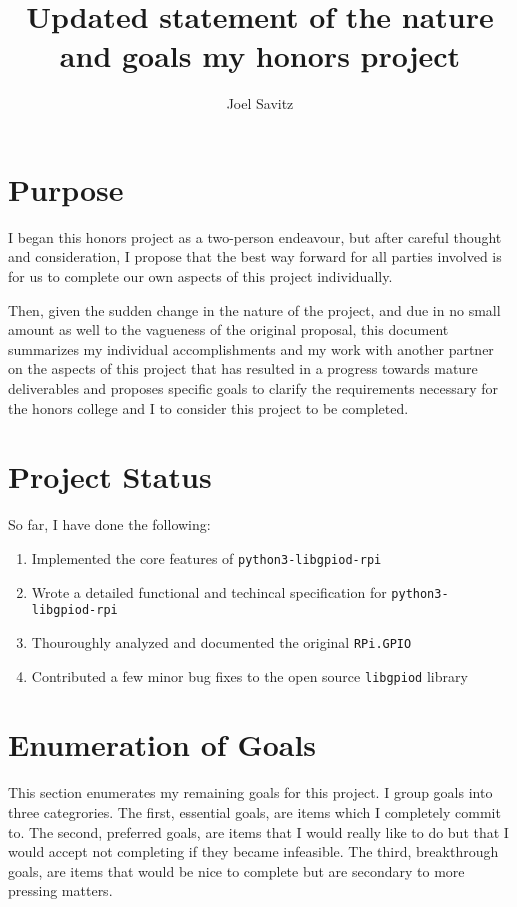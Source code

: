 \documentclass[12pt]{article}
\title{
{Updated statement of the nature and goals my honors project} \\
}
\author{Joel Savitz}
\begin{document}
\maketitle

\section{Purpose}

I began
this honors project
as a two-person endeavour,
but after careful thought and consideration,
I propose that the best way forward
for all parties involved
is for us to complete
our own aspects
of this project
individually.

Then,
given the sudden change
in the nature of the project,
and due in no small amount as well
to the vagueness of the original proposal,
this document summarizes
my individual accomplishments
and my work with another partner
on the aspects of this project
that has resulted in a progress
towards mature deliverables
and proposes specific goals
to clarify the requirements
necessary for the honors college and I
to consider this project to be completed.

\section{Project Status} 

So far, I have done the following:

\begin{enumerate}
	\item Implemented the core features of \texttt{\texttt{python3-libgpiod-rpi}} \cite{gpiolib}
	\item Wrote a detailed functional and techincal specification for \texttt{python3-libgpiod-rpi} \cite{spec}
	\item Thouroughly analyzed and documented the original \texttt{RPi.GPIO} \cite{rpi_gpio}
	\item Contributed a few minor bug fixes to the open source \texttt{libgpiod} library
		\cite{libgpiod_commit1} \cite{libgpiod_commit2}
\end{enumerate}

\section{Enumeration of Goals}

This section enumerates my remaining goals for this project.
I group goals into three categrories.
The first,
essential goals,
are items which I completely commit to.
The second,
preferred goals,
are items that I would really like to do
but that I  would accept not completing
if they became infeasible.
The third,
breakthrough goals,
are items that would be nice to complete
but are secondary to more pressing matters.
\end{document}

